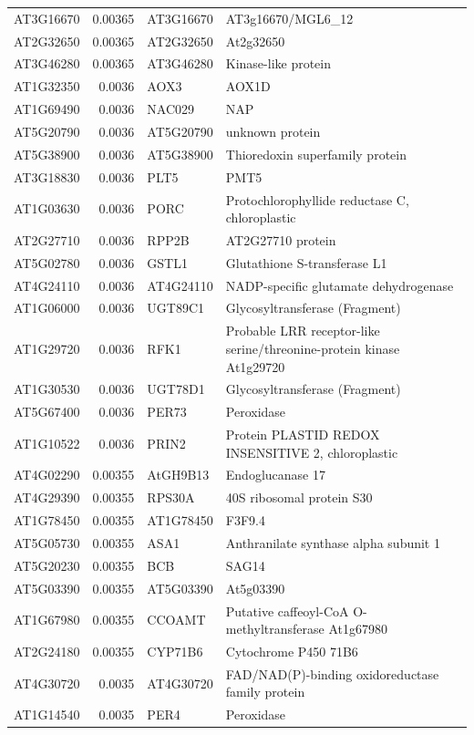 \documentclass[11pt]{article}
\begin{document}
\begin{center}
\begin{tabular}{lrll}
AT3G16670 & 0.00365 & AT3G16670 & AT3g16670/MGL6\_12\\
AT2G32650 & 0.00365 & AT2G32650 & At2g32650\\
AT3G46280 & 0.00365 & AT3G46280 & Kinase-like protein\\
AT1G32350 & 0.0036 & AOX3 & AOX1D\\
AT1G69490 & 0.0036 & NAC029 & NAP\\
AT5G20790 & 0.0036 & AT5G20790 & unknown protein\\
AT5G38900 & 0.0036 & AT5G38900 & Thioredoxin superfamily protein\\
AT3G18830 & 0.0036 & PLT5 & PMT5\\
AT1G03630 & 0.0036 & PORC & Protochlorophyllide reductase C, chloroplastic\\
AT2G27710 & 0.0036 & RPP2B & AT2G27710 protein\\
AT5G02780 & 0.0036 & GSTL1 & Glutathione S-transferase L1\\
AT4G24110 & 0.0036 & AT4G24110 & NADP-specific glutamate dehydrogenase\\
AT1G06000 & 0.0036 & UGT89C1 & Glycosyltransferase (Fragment)\\
AT1G29720 & 0.0036 & RFK1 & Probable LRR receptor-like serine/threonine-protein kinase At1g29720\\
AT1G30530 & 0.0036 & UGT78D1 & Glycosyltransferase (Fragment)\\
AT5G67400 & 0.0036 & PER73 & Peroxidase\\
AT1G10522 & 0.0036 & PRIN2 & Protein PLASTID REDOX INSENSITIVE 2, chloroplastic\\
AT4G02290 & 0.00355 & AtGH9B13 & Endoglucanase 17\\
AT4G29390 & 0.00355 & RPS30A & 40S ribosomal protein S30\\
AT1G78450 & 0.00355 & AT1G78450 & F3F9.4\\
AT5G05730 & 0.00355 & ASA1 & Anthranilate synthase alpha subunit 1\\
AT5G20230 & 0.00355 & BCB & SAG14\\
AT5G03390 & 0.00355 & AT5G03390 & At5g03390\\
AT1G67980 & 0.00355 & CCOAMT & Putative caffeoyl-CoA O-methyltransferase At1g67980\\
AT2G24180 & 0.00355 & CYP71B6 & Cytochrome P450 71B6\\
AT4G30720 & 0.0035 & AT4G30720 & FAD/NAD(P)-binding oxidoreductase family protein\\
AT1G14540 & 0.0035 & PER4 & Peroxidase\\

\end{tabular}
\end{center}
\end{document}

